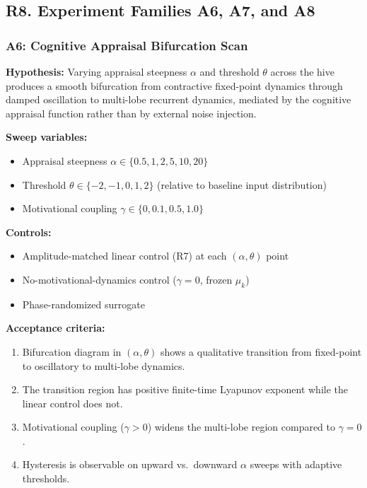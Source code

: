 \subsection*{R8. Experiment Families A6, A7, and A8}

\subsubsection*{A6: Cognitive Appraisal Bifurcation Scan}

\textbf{Hypothesis:} Varying appraisal steepness $\alpha$ and threshold
$\theta$ across the hive produces a smooth bifurcation from contractive
fixed-point dynamics through damped oscillation to multi-lobe recurrent
dynamics, mediated by the cognitive appraisal function rather than by external
noise injection.

\textbf{Sweep variables:}
\begin{itemize}
  \item Appraisal steepness $\alpha\in\{0.5,1,2,5,10,20\}$
  \item Threshold $\theta\in\{-2,-1,0,1,2\}$ (relative to baseline input
        distribution)
  \item Motivational coupling $\gamma\in\{0,0.1,0.5,1.0\}$
\end{itemize}

\textbf{Controls:}
\begin{itemize}
  \item Amplitude-matched linear control (R7) at each $(\alpha,\theta)$ point
  \item No-motivational-dynamics control ($\gamma=0$, frozen $\mu_k$)
  \item Phase-randomized surrogate
\end{itemize}

\textbf{Acceptance criteria:}
\begin{enumerate}
  \item Bifurcation diagram in $(\alpha,\theta)$ shows a qualitative
        transition from fixed-point to oscillatory to multi-lobe dynamics.
  \item The transition region has positive finite-time Lyapunov exponent
        while the linear control does not.
  \item Motivational coupling ($\gamma>0$) widens the multi-lobe region
        compared to $\gamma=0$.
  \item Hysteresis is observable on upward vs.\ downward $\alpha$ sweeps with
        adaptive thresholds.
\end{enumerate}

